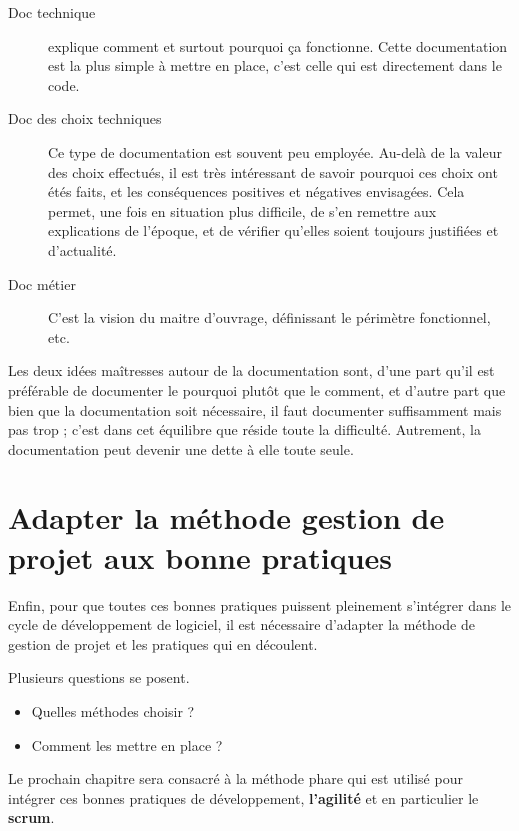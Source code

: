 \begin{description}
    \item[Doc technique]
    {explique comment et surtout pourquoi ça fonctionne. Cette documentation est la plus simple à mettre en place, c'est celle qui est directement dans le code.}
    \item[Doc des choix techniques]
    { Ce type de documentation est souvent peu employée. Au-delà de la valeur des choix effectués, il est très intéressant de savoir pourquoi ces choix ont étés faits, et les conséquences positives et négatives envisagées. Cela permet, une fois en situation plus difficile, de s’en remettre aux explications de l’époque, et de vérifier qu’elles soient toujours justifiées et d’actualité.
        
    }
    \item[Doc métier]{C'est la vision du maitre d'ouvrage, définissant le périmètre fonctionnel, etc. }
\end{description}

Les deux idées maîtresses autour de la documentation sont, d’une part qu’il est préférable de documenter le pourquoi plutôt que le comment, et d’autre part que bien que la documentation soit nécessaire, il faut documenter suffisamment mais pas trop ; c’est dans cet équilibre que réside toute la difficulté. Autrement, la documentation peut devenir une dette à elle toute seule.

\newpage


\section{Adapter la méthode gestion de projet aux bonne pratiques}
Enfin, pour que toutes ces bonnes pratiques puissent pleinement s'intégrer dans le cycle de développement de logiciel, il est nécessaire d'adapter la méthode de gestion de projet et les pratiques qui en découlent. 

Plusieurs questions se posent.

\begin{itemize}
\item Quelles méthodes choisir ?
\item Comment les mettre en place ? 
\end{itemize}

Le prochain chapitre sera consacré à la méthode phare qui est utilisé pour intégrer ces bonnes pratiques de développement, \textbf{l'agilité} et en particulier le \textbf{scrum}. 

